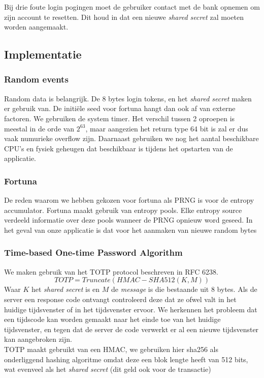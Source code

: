 \documentclass[11pt]{article}
\begin{document}
Bij drie foute login pogingen moet de gebruiker contact met de bank opnemen om zijn account te resetten. Dit houd in dat een nieuwe \emph{shared secret} zal moeten worden aangemaakt.
\subsection{Implementatie}
\subsubsection{Random events}
Random data is belangrijk. De 8 bytes login tokens, en het \emph{shared secret} maken er gebruik van.
De initi\"ele seed voor fortuna hangt dan ook af van externe factoren. We gebruiken de system timer. Het verschil tussen 2 oproepen is meestal in de orde van $2^63$, maar aangezien het return type 64 bit is zal er dus vaak numurieke overflow zijn. Daarnaast gebruiken we nog het aantal beschikbare CPU's en fysiek geheugen dat beschikbaar is tijdens het opstarten van de applicatie.
\subsubsection{Fortuna}
\label{sec:fortuna}
De reden waarom we hebben gekozen voor fortuna als PRNG is voor de entropy accumulator. Fortuna maakt gebruik van entropy pools. Elke entropy source verdeeld informatie over deze pools wanneer de PRNG opnieuw word geseed. In het geval van onze applicatie is dat voor het aanmaken van nieuwe random bytes

\subsubsection{Time-based One-time Password Algorithm}
\label{sec:totp}
We maken gebruik van het TOTP protocol beschreven in RFC 6238.
$$ TOTP = Truncate(HMAC-SHA512(K,M))$$
Waar $K$ het \emph{shared secret} is en $M$ de \emph{message} is die bestaande uit 8 bytes. Als de server een response code ontvangt controleerd deze dat ze ofwel valt in het huidige tijdsvenster of in het tijdsvenster ervoor. We herkennen het probleem dat een tijdscode kan worden gemaakt naar het einde toe van het huidige tijdsvenster, en tegen dat de server de code verwerkt er al een nieuwe tijdsvenster kan aangebroken zijn.\\

TOTP maakt gebruikt van een HMAC, we gebruiken hier sha256 als onderliggend hashing algoritme omdat deze een blok lengte heeft van 512 bits, wat evenveel als het \emph{shared secret} (dit geld ook voor de transactie)
\end{document}
